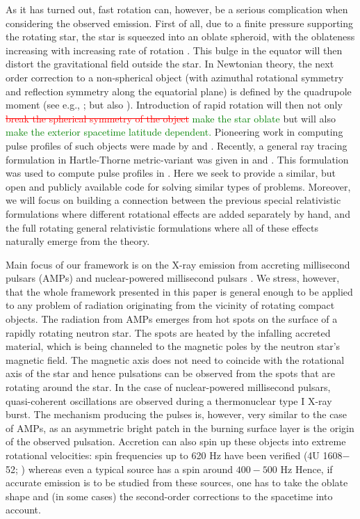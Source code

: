 \documentclass{aa}
\newcommand{\refe}[1]{\textcolor{green}{{#1}}}
\newcommand{\refedel}[1]{\textcolor{red}{\sout{#1}}}
\begin{document}
As it has turned out, fast rotation can, however, be a serious complication when considering the observed emission.
First of all, due to a finite pressure supporting the rotating star, the star is squeezed into an oblate spheroid, with the oblateness increasing with increasing rate of rotation \citep{CST94, MS99, MLC07, BBP13, aGM14}.
This bulge in the equator will then distort the gravitational field outside the star.
In Newtonian theory, the next order correction to a non-spherical object (with azimuthal rotational symmetry and reflection symmetry along the equatorial plane) is defined by the quadrupole moment (see e.g., \citealt{LP99}; but also \citealt{PA12}).
Introduction of rapid rotation will then not only \refedel{break the spherical symmetry of the object} \refe{make the star oblate} but will also \refe{make the exterior spacetime latitude dependent.}
Pioneering work in computing pulse profiles of such objects were made by \citet{CL05} and \citet{CML07}.
Recently, a general ray tracing formulation in Hartle-Thorne metric-variant was given in \citet{PJ12} and \citet{BPO12}. 
This formulation was used to compute pulse profiles in \citet{PO14}.
Here we seek to provide a similar, but open and publicly available code for solving similar types of problems.
Moreover, we will focus on building a connection between the previous special relativistic formulations where different rotational effects are added separately by hand, and the full rotating general relativistic formulations where all of these effects naturally emerge from the theory.


Main focus of our framework is on the X-ray emission from accreting millisecond pulsars (AMPs) \citep{WvdK98, PW12} and nuclear-powered millisecond pulsars \citep{Watts12}.
We stress, however, that the whole framework presented in this paper is general enough to be applied to any problem of radiation originating from the vicinity of rotating compact objects. 
The radiation from AMPs emerges from hot spots on the surface of a rapidly rotating neutron star. The spots are heated by the infalling accreted material, which is being channeled to the magnetic poles by the neutron star's magnetic field.
The magnetic axis does not need to coincide with the rotational axis of the star and hence pulsations can be observed from the spots that are rotating around the star.
In the case of nuclear-powered millisecond pulsars, quasi-coherent oscillations are observed during a thermonuclear type I X-ray burst.
The mechanism producing the pulses is, however, very similar to the case of AMPs, as an asymmetric bright patch in the burning surface layer is the origin of the observed pulsation.
Accretion can also spin up these objects into extreme rotational velocities: spin frequencies up to 620 Hz have been verified (4U 1608$-$52; \citealt{MC02}) whereas even a typical source has a spin around $400-500$ Hz \citep{Watts12, PTR14}
Hence, if accurate emission is to be studied from these sources, one has to take the oblate shape and (in some cases) the second-order corrections to the spacetime into account.
\end{document}
